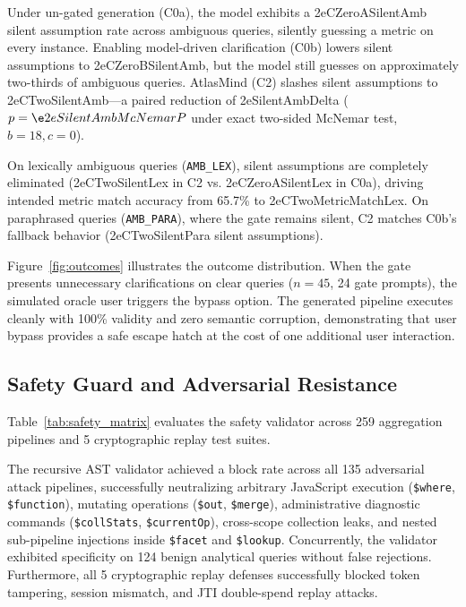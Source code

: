 

Under un-gated generation (C0a), the model exhibits a \e2eCZeroASilentAmb{} silent assumption rate across ambiguous queries, silently guessing a metric on every instance. Enabling model-driven clarification (C0b) lowers silent assumptions to \e2eCZeroBSilentAmb{}, but the model still guesses on approximately two-thirds of ambiguous queries. AtlasMind (C2) slashes silent assumptions to \e2eCTwoSilentAmb{}---a paired reduction of \e2eSilentAmbDelta{} ($p = \e2eSilentAmbMcNemarP{}$ under exact two-sided McNemar test, $b = 18, c = 0$).



On lexically ambiguous queries (\texttt{AMB\_LEX}), silent assumptions are completely eliminated (\e2eCTwoSilentLex{} in C2 vs. \e2eCZeroASilentLex{} in C0a), driving intended metric match accuracy from 65.7\% to \e2eCTwoMetricMatchLex{}. On paraphrased queries (\texttt{AMB\_PARA}), where the gate remains silent, C2 matches C0b's fallback behavior (\e2eCTwoSilentPara{} silent assumptions).

Figure~\ref{fig:outcomes} illustrates the outcome distribution. When the gate presents unnecessary clarifications on clear queries ($n = 45$, 24 gate prompts), the simulated oracle user triggers the bypass option. The generated pipeline executes cleanly with 100\% validity and zero semantic corruption, demonstrating that user bypass provides a safe escape hatch at the cost of one additional user interaction.

\subsection{Safety Guard and Adversarial Resistance}
Table~\ref{tab:safety_matrix} evaluates the safety validator across 259 aggregation pipelines and 5 cryptographic replay test suites.



The recursive AST validator achieved a \safetyAdversarialBlockRate{} block rate across all 135 adversarial attack pipelines, successfully neutralizing arbitrary JavaScript execution (\texttt{\$where}, \texttt{\$function}), mutating operations (\texttt{\$out}, \texttt{\$merge}), administrative diagnostic commands (\texttt{\$collStats}, \texttt{\$currentOp}), cross-scope collection leaks, and nested sub-pipeline injections inside \texttt{\$facet} and \texttt{\$lookup}. Concurrently, the validator exhibited \safetyBenignAllowRate{} specificity on 124 benign analytical queries without false rejections. Furthermore, all 5 cryptographic replay defenses successfully blocked token tampering, session mismatch, and JTI double-spend replay attacks.
